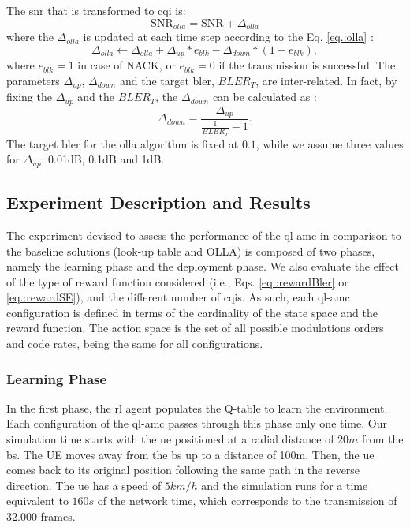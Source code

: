%
The \gls{snr} that is transformed to \gls{cqi} is:
\begin{equation}
\textrm{SNR}_{olla} = \textrm{SNR} + \Delta_{olla}
\end{equation}
\noindent where the $\Delta_{olla}$ is updated at each time step according to the Eq. \eqref{eq.:olla} \cite{Blanquez-Casado2016}:
\begin{equation}\label{eq.:olla}
  \Delta_{olla} \leftarrow \Delta_{olla} + \Delta_{up} * e_{blk} - \Delta_{down} *(1 - e_{blk}),
\end{equation}
\noindent where $e_{blk} = 1$ in case of NACK, or $e_{blk} = 0$ if the transmission is successful.
%
The parameters $\Delta_{up}$, $\Delta_{down}$ and the target \gls{bler}, $BLER_{T}$, are inter-related. In fact, by fixing the $\Delta_{up}$ and the $BLER_{T}$, the $\Delta_{down}$ can be calculated as \cite{Pedersen2007}:
$$
\Delta_{down} = \frac{\Delta_{up}}{\frac{1}{BLER_{T}} -1}.
$$
The target \gls{bler} for the \gls{olla} algorithm is fixed at $0.1$, while we assume three values for $\Delta_{up}$: 0.01dB, 0.1dB and  1dB.

\subsection{Experiment Description and Results}

The experiment devised to assess the performance of the \gls{ql-amc} in comparison to the baseline solutions (look-up table and OLLA) is composed of two phases, namely the learning phase and the deployment phase.
%
We also evaluate the effect of the type of reward function considered (i.e., Eqs. \eqref{eq.:rewardBler} or \eqref{eq.:rewardSE}), and the different number of \gls{cqi}s. As such, each \gls{ql-amc} configuration is defined in terms of the cardinality of the state space and the reward function.
%
The action space is the set of all possible modulations orders and code rates, being the same for all configurations.


\subsubsection{Learning Phase}
In the first phase, the \gls{rl} agent populates the Q-table to learn the environment.
%
Each configuration of the \gls{ql-amc} passes through this phase only one time. Our simulation time starts with the \gls{ue} positioned at a radial distance of $20m$ from the \gls{bs}. The UE moves away from the \gls{bs} up to a distance of 100m. Then, the \gls{ue} comes back to its original position following the same path in the reverse direction.
%
The \gls{ue} has a speed of $5km/h$ and the simulation runs for a time equivalent to $160s$ of the network time, which corresponds to the transmission of 32.000 frames.
%


